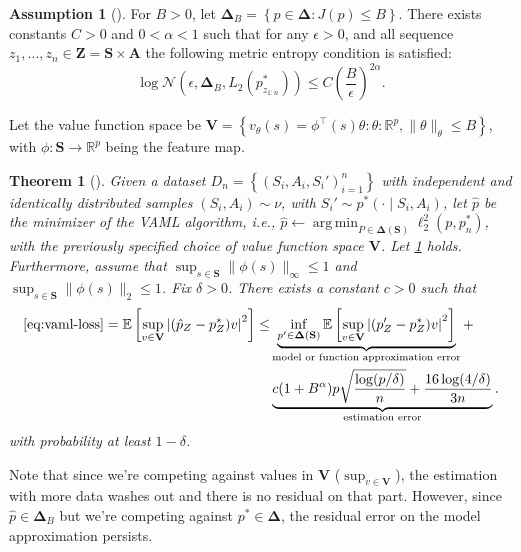 \documentclass[a4paper]{article}
\theoremstyle{definition}
\newtheorem{assumption}{Assumption}
\theoremstyle{remark}
\theoremstyle{plain}
\newtheorem{theorem}{Theorem}
\newcommand{\bA}{\mathbf{A}}
\newcommand{\bS}{\mathbf{S}}
\newcommand{\cN}{\mathcal{N}}
\newcommand{\bV}{\mathbf{V}}
\newcommand{\bZ}{\mathbf{Z}}
\newcommand{\bDelta}{\mathbf{\Delta}}
\newcommand{\R}{\mathbb{R}}
\newcommand{\E}{\mathbb{E}}
\DeclareMathOperator*{\argmin}{arg\,min}
\begin{document}
\begin{assumption}[{\normalfont\citet[Assumption A1, Capacity of the function space]{farahmand2017value}}]
\label{assm:log-entrpy}
For $B >0$, let $\bDelta_B = \left\{p \in \bDelta: J(p) \leq B \right\}$. There exists constants $C > 0$ and $0 < \alpha < 1$ such that for any $\epsilon > 0$, and all sequence $z_1, \dots, z_n \in \bZ = \bS \times \bA$ the following metric entropy condition is satisfied:
\begin{equation*}
    \log \cN \left(\epsilon, \bDelta_B,  L_2(p^*_{z_{1:n}})\right) \leq C\left(\frac{B}{\epsilon}\right)^{2\alpha}.
\end{equation*}
\end{assumption}
Let the value function space be $\bV = \left\{v_\theta(s) = \phi^\top(s)\theta: \theta: \R^p, \lVert\theta\rVert_\theta \leq B \right\}$, with $\phi: \bS \to \R^p$ being the feature map.
%
\begin{theorem}[{\normalfont\citet[Theorem 2]{farahmand2017value}}]
Given a dataset $D_n = \left\{\left(S_i, A_i, S_i' \right)_{i = 1}^n \right\}$ with independent and identically distributed samples $(S_i, A_i) \sim \nu$, with $S_i' \sim p^*(\cdot \mid S_i, A_i)$, let $\hat{p}$ be the minimizer of the VAML algorithm, i.e., $\hat{p} \gets \argmin_{P \in \bDelta(\bS)} \ell^2_{2}(p, p_n^*)$, with the previously specified choice of value function space $\bV$. Let \cref{assm:log-entrpy} holds. Furthermore, assume that $\sup_{s \in \bS} \lVert \phi(s)\rVert_\infty \leq 1$ and $\sup_{s \in \bS} \lVert \phi(s)\rVert_2 \leq 1$. Fix $\delta > 0$. There exists a constant $c > 0$ such that
\begin{align}
    \text{\cref{eq:vaml-loss}} = \E \left[\sup_{v \in \bV} \left \lvert (\hat{p}_Z - p^*_Z)v\right\rvert^2 \right] \leq 
    & \underbrace{\inf_{p' \in \bDelta(\bS)}\E \left[\sup_{v \in \bV} \left\lvert (p'_Z - p^*_Z)v\right\rvert^2 \right]}_{\text{model or function approximation error}} + \\ \nonumber
    & \underbrace{c(1 + B^\alpha)p \sqrt{\frac{\log(p / \delta) }{n}} + \frac{16\log(4 /\delta)}{3n}}_{\text{estimation error}}.
\end{align}
with probability at least $1 - \delta$.
\end{theorem}
Note that since we're competing against values in $\bV$ ($\sup_{v \in \bV}$), the estimation with more data washes out and there is no residual on that part. However, since $\hat{p} \in \bDelta_B$ but we're competing against $p^* \in \bDelta$, the residual error on the model approximation persists. 
\end{document}
